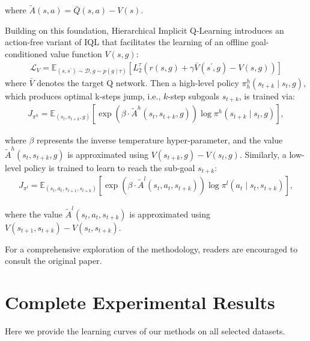 where $\tilde{A}\left(s, a\right) = \bar{Q}(s,a) - V(s)$.

Building on this foundation, Hierarchical Implicit Q-Learning \citep{park2023hiql} introduces an action-free variant of IQL that facilitates the learning of an offline goal-conditioned value function $V(s, g)$:
\begin{align}
\mathcal{L}_V=\mathbb{E}_{\left(s, s^{\prime}\right) \sim \mathcal{D}, g \sim p(g \mid \tau)}\left[L_2^\tau\left(r(s, g)+\gamma \bar{V}\left(s^{\prime}, g\right)-V(s, g)\right)\right]
\end{align}
where $\bar{V}$ denotes the target Q network. Then a high-level policy $\pi_{h}^h\left(s_{t+k} \mid s_t, g\right)$, which produces optimal k-steps jump, i.e., $k$-step subgoals $s_{t+k}$, is trained via:
\begin{align}
J_{\pi^h}=\mathbb{E}_{\left(s_t, s_{t+k}, g\right)}\left[\exp \left(\beta \cdot \tilde{A}^h\left(s_t, s_{t+k}, g\right)\right) \log \pi^h\left(s_{t+k} \mid s_t, g\right)\right],
\end{align}

where $\beta$ represents the inverse temperature hyper-parameter, and the value $\tilde{A}^h\left(s_t, s_{t+k}, g\right)$ is approximated using $V\left(s_{t+k}, g\right)-V\left(s_t, g\right)$. Similarly, a low-level policy is trained to learn to reach the sub-goal $s_{t+k}$:
\begin{align}
J_{\pi^l}=\mathbb{E}_{\left(s_t, a_t, s_{t+1}, s_{t+k}\right)}\left[\exp \left(\beta \cdot \tilde{A}^l\left(s_t, a_t, s_{t+k}\right)\right) \log \pi^l\left(a_t \mid s_t, s_{t+k}\right)\right],
\end{align}

where the value $\tilde{A}^l\left(s_t, a_t, s_{t+k}\right)$ is approximated using $V\left(s_{t+1}, s_{t+k}\right)-V\left(s_t, s_{t+k}\right)$. 

For a comprehensive exploration of the methodology, readers are encouraged to consult the original paper.







\section{Complete Experimental Results}
Here we provide the learning curves of our methods on all selected datasets.


